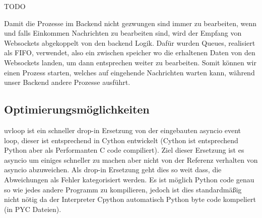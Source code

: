 TODO

Damit die Prozesse im Backend nicht gezwungen sind immer zu bearbeiten, 
wenn und falls Einkommen Nachrichten zu bearbeiten sind, 
wird der Empfang von Websockets abgekoppelt von den backend Logik.
Dafür wurden Queues, realisiert als FIFO, verwendet, also ein zwischen speicher 
wo die erhaltenen Daten von den Websockets landen, um dann entsprechen weiter zu bearbeiten.
Somit können wir einen Prozess starten, welches auf eingehende Nachrichten warten kann, 
während unser Backend andere Prozesse ausführt.

\subsection{Optimierungsmöglichkeiten}
\label{subsec:Optimierungsmöglichkeiten}
uvloop ist ein schneller drop-in Ersetzung von der eingebauten asyncio event loop, 
dieser ist entsprechend in Cython entwickelt (Cython ist entsprechend Python aber als Performanten C code compiliert).
Ziel dieser Ersetzung ist es asyncio um einiges schneller zu machen aber nicht von der Referenz verhalten von asyncio abzuweichen. 
Als drop-in Ersetzung geht dies so weit dass, die Abweichungen als Fehler kategorisiert werden.
Es ist möglich Python code genau so wie jedes andere Programm zu kompilieren,
jedoch ist dies standardmäßig nicht nötig da der Interpreter Cpython automatisch Python byte code kompeliert (in PYC Dateien).

